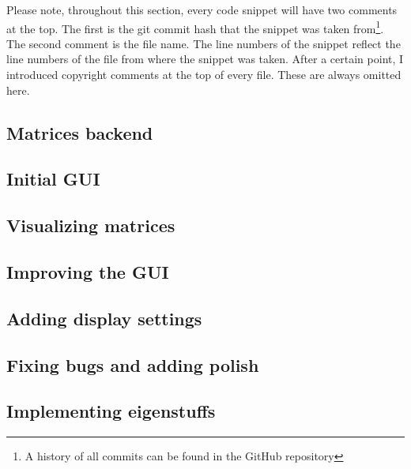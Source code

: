 \documentclass[../main.tex]{subfiles}
\begin{document}
Please note, throughout this section, every code snippet will have two comments at the top. The first is the git commit hash that the snippet was taken from\footnote{A history of all commits can be found in the GitHub repository\cite{lintrans-github}}. The second comment is the file name. The line numbers of the snippet reflect the line numbers of the file from where the snippet was taken. After a certain point, I introduced copyright comments at the top of every file. These are always omitted here.

\subsection{Matrices backend\label{development:matrices-backend}}


\subsection{Initial GUI\label{development:initial-gui}}


\subsection{Visualizing matrices\label{development:visualizing-matrices}}


\subsection{Improving the GUI\label{development:improving-the-gui}}


\subsection{Adding display settings\label{development:adding-display-settings}}


\subsection{Fixing bugs and adding polish\label{development:fixing-bugs-and-adding-polish}}


\subsection{Implementing eigenstuffs\label{development:implementing-eigenstuffs}}

\end{document}
